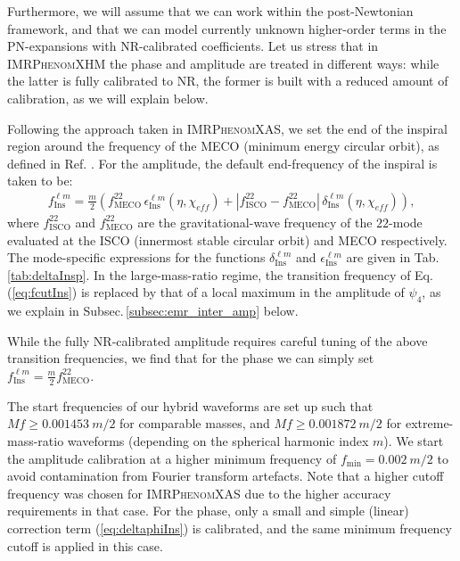\documentclass[twocolumn,prd,aps,superscriptaddress,preprintnumbers,tightenlines,showpacs,nofootinbib,eqsecnum,amsfonts,amsmath]{revtex4}
\newcommand{\phX}{\textsc{IMRPhenomXAS}\xspace}
\newcommand{\phXHM}{\textsc{IMRPhenomXHM}\xspace}
\begin{document}
Furthermore, we will assume that we can work within the post-Newtonian framework, and that we can model currently unknown higher-order terms in the PN-expansions with NR-calibrated coefficients.
Let us stress that in \phXHM the phase and amplitude are treated in different ways: while the latter is fully calibrated to NR, the former is built with a reduced amount of calibration, as we will explain below.

Following the approach taken in \phX, we set the end of the inspiral region around the frequency of the MECO (minimum energy circular orbit), as defined in Ref. \cite{Cabero:2016ayq}. For the amplitude, the default end-frequency of the inspiral is taken to be:
%
\begin{align}
\label{eq:fcutIns}
f_{\mathrm{Ins}}^{\ell m} = 
\frac{m}{2}\left(f^{22}_{\mathrm{ MECO}} \, \epsilon^{\ell m}_{\mathrm{Ins}}(\eta,\chi_{eff})+|f^{22}_{\mathrm{ISCO}}-f^{22}_{\mathrm{MECO}}| \, \delta^{\ell m}_{\mathrm{Ins}}(\eta,\chi_{eff})\right),
\end{align} 
%
where $f^{22}_{\mathrm{ISCO}}$ and $f^{22}_{\mathrm{MECO}}$ are the gravitational-wave frequency of the $22$-mode evaluated at the ISCO (innermost stable circular orbit) and MECO respectively. 
The mode-specific expressions for the functions $\delta^{\ell m}_{\mathrm{Ins}}$ and $\epsilon^{\ell m}_{\mathrm{Ins}}$ are given in Tab. \ref{tab:deltaInsp}. In the large-mass-ratio regime, the transition frequency of Eq.\,(\ref{eq:fcutIns}) is replaced by that of a local maximum in the amplitude of $\psi_4$, as we explain in Subsec.\,\ref{subsec:emr_inter_amp} below. 

While the fully NR-calibrated amplitude requires careful tuning of the above transition frequencies, we find that for the phase we can simply set $f_{\mathrm{Ins}}^{\ell m}=\frac{m}{2}f^{22}_{\mathrm{MECO}}$. 


The start frequencies of our hybrid waveforms \cite{hybrids} are set up such that
$Mf \geq 0.001453 \:m/2 $ for comparable masses, and 
$Mf \geq 0.001872 \:m/2 $ for extreme-mass-ratio waveforms (depending on the spherical harmonic index $m$). We start the amplitude calibration at a higher minimum frequency of $f_{\mathrm{min}}=0.002 \:m/2 $
to avoid contamination from Fourier transform artefacts. Note that a higher cutoff frequency was chosen for \phX due to the higher accuracy requirements in that case. For the phase, only a small and simple (linear) correction term (\ref{eq:deltaphiIns}) is calibrated, and the same minimum frequency cutoff is applied in this case.
\end{document}
